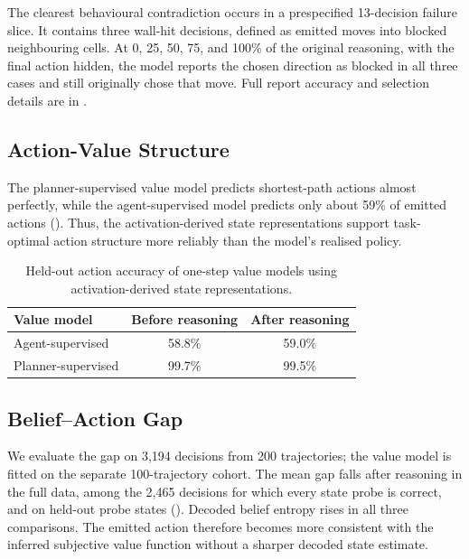 \documentclass{article}
\begin{document}
The clearest behavioural contradiction occurs in a prespecified 13-decision failure slice. It contains three wall-hit decisions, defined as emitted moves into blocked neighbouring cells. At 0, 25, 50, 75, and 100\% of the original reasoning, with the final action hidden, the model reports the chosen direction as blocked in all three cases and still originally chose that move. Full report accuracy and selection details are in .

\subsection{Action-Value Structure}\label{sec:value-results}
The planner-supervised value model predicts shortest-path actions almost perfectly, while the agent-supervised model predicts only about 59\% of emitted actions (). Thus, the activation-derived state representations support task-optimal action structure more reliably than the model's realised policy.

\begin{table}[htbp]
\centering\small
\begin{tabular}{lcc}
\toprule
Value model & Before reasoning & After reasoning \\
\midrule
Agent-supervised & 58.8\% & 59.0\% \\
Planner-supervised & 99.7\% & 99.5\% \\
\bottomrule
\end{tabular}
\caption{Held-out action accuracy of one-step value models using activation-derived state representations.}
\label{tab:value-results}
\end{table}

\subsection{Belief--Action Gap}\label{sec:decomposition}
We evaluate the gap on 3,194 decisions from 200 trajectories; the value model is fitted on the separate 100-trajectory cohort. The mean gap falls after reasoning in the full data, among the 2,465 decisions for which every state probe is correct, and on held-out probe states (). Decoded belief entropy rises in all three comparisons. The emitted action therefore becomes more consistent with the inferred subjective value function without a sharper decoded state estimate.
\end{document}
